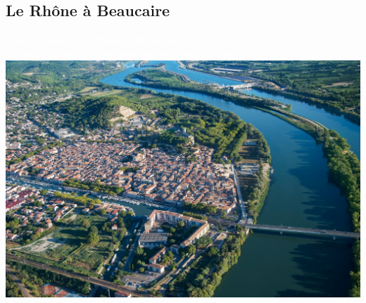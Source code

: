 \documentclass[compress,9pt]{beamer}
\begin{document}
	
	
	\subsection{Le Rhône à Beaucaire}
	{
    \begin{frame}
        \begin{center}
				\textcolor{white}{\Large \textbf{Cas d'étude : Le Rhône à Beaucaire}}\\
		 		\vspace{0.3cm}
		 		\textcolor{white}{\large \textbf{Collecte et caractérisation des données de crue}}\\
		 		\vspace{0.7cm}
		 		\includegraphics[width = .7\textwidth]{./Figures/BcrAerien.jpg} 
        \end{center}
    \end{frame}
    }
    	
\end{document}
